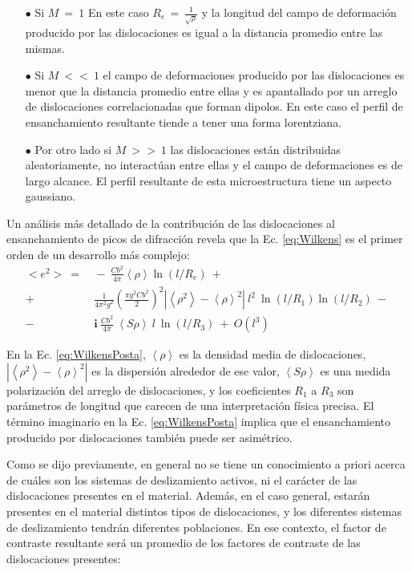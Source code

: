 \begin{itemize}
  \item[$\bullet$] Si $M \ = \ 1 $ En este caso $R_e\,=\,\frac{1}{\sqrt{\rho}}$ y la longitud del campo de deformación producido por las dislocaciones es igual a la distancia promedio entre las mismas.
  \item[$\bullet$] Si $M \ << \ 1 $ el campo de deformaciones producido por las dislocaciones es menor que la distancia promedio entre ellas y es apantallado por un arreglo de dislocaciones correlacionadas que forman dipolos. En este caso el perfil de ensanchamiento resultante tiende a tener una forma lorentziana.
  \item[$\bullet$] Por otro lado si $M \ >> \ 1 $ las dislocaciones están distribuidas aleatoriamente, no interactúan entre ellas y el campo de deformaciones es de largo alcance. El perfil resultante de esta microestructura tiene un aspecto gaussiano.
\end{itemize}

Un análisis más detallado de la contribución de las dislocaciones al ensanchamiento de picos de difracción revela que la Ec. \ref{eq:Wilkens} es el primer orden de un desarrollo más complejo\cite{Groma1988}:
\begin{equation}
  \begin{split}
      <e^2> \ = & \ - \ \frac{Cb^2}{4 \pi}\left< \rho \right> \ln \left( l/R_e \right) \ + \ \\
      + & \ \frac{1}{4\pi^2g^2} \left( \frac{\pi g^2 C b^2}{2} \right)^2 |\left<\rho^2\right> - \left< \rho \right>^2| \ l^2 \ \ln(l/R_1) \ln(l/R_2) \ - \ \\
      - & \ \mathbf{i} \ \frac{Cb^2}{4\pi} \ \left< S\rho \right> \ l \ \ln(l/R_3) \ + \ O(l^3)
  \end{split}
  \label{eq:WilkensPosta}
\end{equation}
\noindent

En la Ec. \ref{eq:WilkensPosta}, $\left< \rho \right>$ es la densidad media de dislocaciones, $|\left<\rho^2\right> - \left< \rho \right>^2|$ es la dispersión alrededor de ese valor, $\left< S\rho \right>$ es una medida polarización del arreglo de dislocaciones, y los coeficientes $R_1$ a $R_3$ son parámetros de longitud que carecen de una interpretación física precisa.
El término imaginario en la Ec. \ref{eq:WilkensPosta} implica que el ensanchamiento producido por dislocaciones también puede ser asimétrico.

Como se dijo previamente, en general no se tiene un conocimiento a priori acerca de cuáles son los sistemas de deslizamiento activos, ni el carácter de las dislocaciones presentes en el material. Además, en el caso general, estarán presentes en el material distintos tipos de dislocaciones, y los diferentes sistemas de deslizamiento tendrán diferentes poblaciones. En ese contexto, el factor de contraste resultante será un promedio de los factores de contraste de las dislocaciones presentes:

